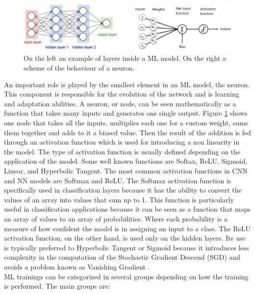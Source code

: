 \documentclass[12pt]{report}
\begin{document}
\begin{figure}[h!]
    \centering
    \includegraphics[width=140mm]{Figures/Chapter1/modelstructure.jpg} 
    \caption{On the left an example of layers inside a ML model. On the right a scheme of the behaviour of a neuron.}
    \label{fig:modelstructure}    
\end{figure}

An important role is played by the smallest element in an ML model, the neuron. This component is responsible for the evolution of the network and is learning and adaptation abilities. A neuron, or node, can be seen mathematically as a function that takes many inputs and generates one single output. Figure \ref{fig:modelstructure} shows one node that takes all the inputs, multiplies each one for a custom weight, sums them together and adds to it a biased value. Then the result of the addition is fed through an activation function which is used for introducing a non linearity in the model. The type of activation function is usually defined depending on the application of the model. Some well known functions are Softax, ReLU, Sigmoid, Linear, and Hyperbolic Tangent. 
The most common activation functions in CNN and NN models are Softmax and ReLU. 
The Softmax activation function is specifically used in classification layers because it has the ability to convert the values of an array into values that sum up to 1. This function is particularly useful in classification applications because it can be seen as a function that maps an array of values to an array of probabilities. Where each probability is a measure of how confident the model is in assigning an input to a class. The ReLU activation function, on the other hand, is used only on the hidden layers. Its use is typically preferred to Hyperbolic Tangent or Sigmoid because it introduces less complexity in the computation of the Stochastic Gradient Descend (SGD) and avoids a problem known as Vanishing Gradient \cite{ReLU_explanation}.\\
ML trainings can be categorized in several groups depending on how the training is performed. The main groups are:
\end{document}

